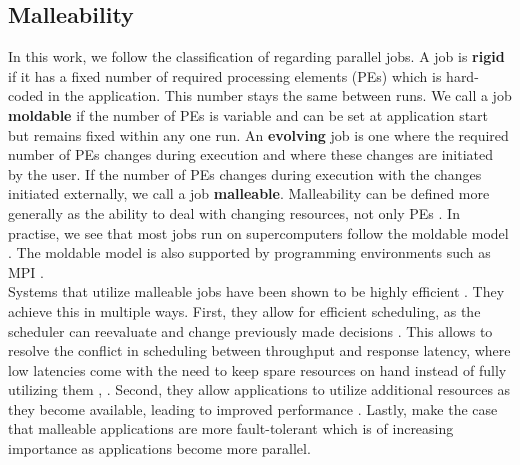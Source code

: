 \subsection{Malleability}
\label{prelim: malleability}
In this work, we follow the classification of \cite{feitelson1997job} regarding parallel jobs. A job is \textbf{rigid} if it has a fixed number of required processing elements (PEs) which is hard-coded in the application. This number stays the same between runs. We call a job \textbf{moldable} if the number of PEs is variable and can be set at application start but remains fixed within any one run. An \textbf{evolving} job is one where the required number of PEs changes during execution and where these changes are initiated by the user. If the number of PEs changes during execution with the changes initiated externally, we call a job \textbf{malleable}.
Malleability can be defined more generally as the ability to deal with changing resources, not only PEs \cite{sonmez2007scheduling}. In practise, we see that most jobs run on supercomputers follow the moldable model \cite{cirne2001model}. The moldable model is also supported by programming environments such as MPI \cite{hungershofer2004combined}. \\
Systems that utilize malleable jobs have been shown to be highly efficient \cite{feitelson1997job}.
They achieve this in multiple ways.
First, they allow for efficient scheduling, as the scheduler can reevaluate and change previously made decisions \cite{sonmez2007scheduling}. This allows to resolve the conflict in scheduling between throughput and response latency, where low latencies come with the need to keep spare resources on hand instead of fully utilizing them \cite{feitelson1997job}, \cite{hungershofer2004combined}.
Second, they allow applications to utilize additional resources as they become available, leading to improved performance \cite{hungershofer2004combined}. Lastly, \cite{buisson2005framework} make the case that malleable applications are more fault-tolerant which is of increasing importance as applications become more parallel. \\
